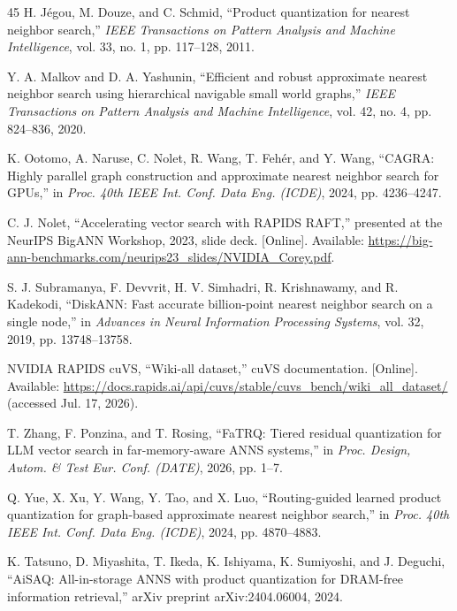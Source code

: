 \begin{thebibliography}{45}
H. J\'egou, M. Douze, and C. Schmid, ``Product quantization for nearest neighbor search,'' \emph{IEEE Transactions on Pattern Analysis and Machine Intelligence}, vol. 33, no. 1, pp. 117--128, 2011.

Y. A. Malkov and D. A. Yashunin, ``Efficient and robust approximate nearest neighbor search using hierarchical navigable small world graphs,'' \emph{IEEE Transactions on Pattern Analysis and Machine Intelligence}, vol. 42, no. 4, pp. 824--836, 2020.

K. Ootomo, A. Naruse, C. Nolet, R. Wang, T. Feh\'er, and Y. Wang, ``CAGRA: Highly parallel graph construction and approximate nearest neighbor search for GPUs,'' in \emph{Proc. 40th IEEE Int. Conf. Data Eng. (ICDE)}, 2024, pp. 4236--4247.

C. J. Nolet, ``Accelerating vector search with RAPIDS RAFT,'' presented at the NeurIPS BigANN Workshop, 2023, slide deck. [Online]. Available: \url{https://big-ann-benchmarks.com/neurips23_slides/NVIDIA_Corey.pdf}.

S. J. Subramanya, F. Devvrit, H. V. Simhadri, R. Krishnawamy, and R. Kadekodi, ``DiskANN: Fast accurate billion-point nearest neighbor search on a single node,'' in \emph{Advances in Neural Information Processing Systems}, vol. 32, 2019, pp. 13748--13758.

NVIDIA RAPIDS cuVS, ``Wiki-all dataset,'' cuVS documentation. [Online]. Available: \url{https://docs.rapids.ai/api/cuvs/stable/cuvs_bench/wiki_all_dataset/} (accessed Jul. 17, 2026).

T. Zhang, F. Ponzina, and T. Rosing, ``FaTRQ: Tiered residual quantization for LLM vector search in far-memory-aware ANNS systems,'' in \emph{Proc. Design, Autom. \& Test Eur. Conf. (DATE)}, 2026, pp. 1--7.

Q. Yue, X. Xu, Y. Wang, Y. Tao, and X. Luo, ``Routing-guided learned product quantization for graph-based approximate nearest neighbor search,'' in \emph{Proc. 40th IEEE Int. Conf. Data Eng. (ICDE)}, 2024, pp. 4870--4883.

K. Tatsuno, D. Miyashita, T. Ikeda, K. Ishiyama, K. Sumiyoshi, and J. Deguchi, ``AiSAQ: All-in-storage ANNS with product quantization for DRAM-free information retrieval,'' arXiv preprint arXiv:2404.06004, 2024.


\end{thebibliography}
